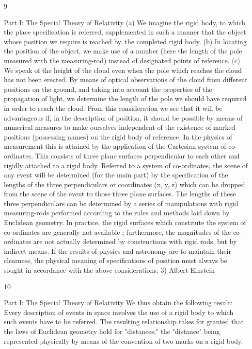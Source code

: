 \documentclass{article}
\begin{document}
9

Part I: The Special Theory of Relativity
(a) We imagine the rigid body, to which the place specification is
referred, supplemented in such a manner that the object whose
position we require is reached by. the completed rigid body.
(b) In locating the position of the object, we make use of a number
(here the length of the pole measured with the measuring-rod)
instead of designated points of reference.
(c) We speak of the height of the cloud even when the pole which
reaches the cloud has not been erected. By means of optical
observations of the cloud from different positions on the ground,
and taking into account the properties of the propagation of light,
we determine the length of the pole we should have required in
order to reach the cloud.
From this consideration we see that it will be advantageous if, in the description of
position, it should be possible by means of numerical measures to make ourselves
independent of the existence of marked positions (possessing names) on the rigid body of
reference. In the physics of measurement this is attained by the application of the Cartesian
system of co-ordinates.
This consists of three plane surfaces perpendicular to each other and rigidly attached to a
rigid body. Referred to a system of co-ordinates, the scene of any event will be determined
(for the main part) by the specification of the lengths of the three perpendiculars or coordinates (x, y, z) which can be dropped from the scene of the event to those three plane
surfaces. The lengths of these three perpendiculars can be determined by a series of
manipulations with rigid measuring-rods performed according to the rules and methods laid
down by Euclidean geometry.
In practice, the rigid surfaces which constitute the system of co-ordinates are generally
not available ; furthermore, the magnitudes of the co-ordinates are not actually determined
by constructions with rigid rods, but by indirect means. If the results of physics and
astronomy are to maintain their clearness, the physical meaning of specifications of position
must always be sought in accordance with the above considerations. 3)
Albert Einstein

10

Part I: The Special Theory of Relativity
We thus obtain the following result: Every description of events in space involves the use
of a rigid body to which such events have to be referred. The resulting relationship takes for
granted that the laws of Euclidean geometry hold for "distances;" the "distance" being
represented physically by means of the convention of two marks on a rigid body.
\end{document}
